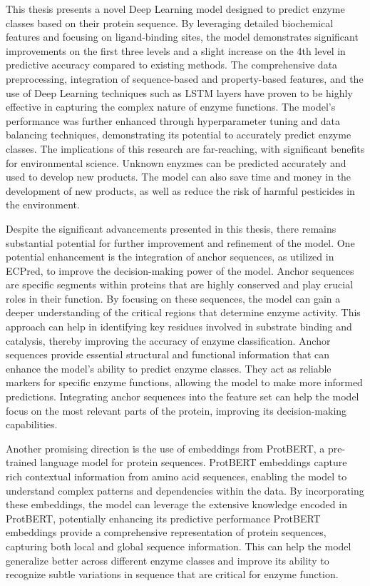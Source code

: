 This thesis presents a novel Deep Learning model designed to predict enzyme classes based on their protein sequence. By leveraging detailed biochemical features and focusing on ligand-binding sites, the model demonstrates significant improvements on the first three levels and a slight increase on the 4th level in predictive accuracy compared to existing methods. The comprehensive data preprocessing, integration of sequence-based and property-based features, and the use of Deep Learning techniques such as LSTM layers have proven to be highly effective in capturing the complex nature of enzyme functions. The model's performance was further enhanced through hyperparameter tuning and data balancing techniques, demonstrating its potential to accurately predict enzyme classes. The implications of this research are far-reaching, with significant benefits for environmental science. Unknown enyzmes can be predicted accurately and used to develop new products. The model can also save time and money in the development of new products, as well as reduce the risk of harmful pesticides in the environment.

Despite the significant advancements presented in this thesis, there remains substantial potential for further improvement and refinement of the model. One potential enhancement is the integration of anchor sequences, as utilized in ECPred, to improve the decision-making power of the model. Anchor sequences are specific segments within proteins that are highly conserved and play crucial roles in their function. By focusing on these sequences, the model can gain a deeper understanding of the critical regions that determine enzyme activity. This approach can help in identifying key residues involved in substrate binding and catalysis, thereby improving the accuracy of enzyme classification. Anchor sequences provide essential structural and functional information that can enhance the model's ability to predict enzyme classes. They act as reliable markers for specific enzyme functions, allowing the model to make more informed predictions. Integrating anchor sequences into the feature set can help the model focus on the most relevant parts of the protein, improving its decision-making capabilities.

Another promising direction is the use of embeddings from ProtBERT, a pre-trained language model for protein sequences. ProtBERT embeddings capture rich contextual information from amino acid sequences, enabling the model to understand complex patterns and dependencies within the data. By incorporating these embeddings, the model can leverage the extensive knowledge encoded in ProtBERT, potentially enhancing its predictive performance ProtBERT embeddings provide a comprehensive representation of protein sequences, capturing both local and global sequence information. This can help the model generalize better across different enzyme classes and improve its ability to recognize subtle variations in sequence that are critical for enzyme function.

